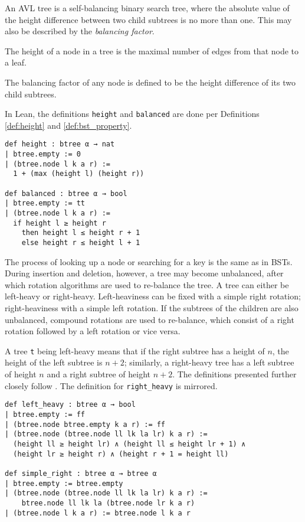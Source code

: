 An AVL tree \cite{avl:original} is a self-balancing binary search tree, where the absolute value of the height difference between two child subtrees is no more than one.
This may also be described by the \textit{balancing factor}.

\begin{definition}
  \label{def:height}
  The height of a node in a tree is the maximal number of edges from that node to a leaf.
\end{definition}

\begin{definition}
  \label{def:balancing_factor}
  The balancing factor of any node is defined to be the height difference of its two child subtrees.
\end{definition}

In Lean, the definitions \lstinline{height} and \lstinline{balanced} are done per Definitions \ref{def:height} and \ref{def:bst_property}.

\begin{lstlisting}
def height : btree α → nat
| btree.empty := 0
| (btree.node l k a r) :=
  1 + (max (height l) (height r))

def balanced : btree α → bool
| btree.empty := tt
| (btree.node l k a r) :=
  if height l ≥ height r 
    then height l ≤ height r + 1
    else height r ≤ height l + 1
\end{lstlisting}

The process of looking up a node or searching for a key is the same as in BSTs. During insertion and deletion, however, a tree may become unbalanced, after which rotation algorithms are used to re-balance the tree. A tree can either be left-heavy or right-heavy. Left-heaviness can be fixed with a simple right rotation; right-heaviness with a simple left rotation. If the subtrees of the children are also unbalanced, compound rotations are used to re-balance, which consist of a right rotation followed by a left rotation or vice versa.

A tree \lstinline{t} being left-heavy means that if the right subtree has a height of $n$, the height of the left subtree is $n+2$; similarly, a right-heavy tree has a left subtree of height $n$ and a right subtree of height $n+2$. The definitions presented further closely follow \cite{textbook:discrete_computer}. The definition for \lstinline{right_heavy} is mirrored.

\begin{lstlisting}
def left_heavy : btree α → bool
| btree.empty := ff
| (btree.node btree.empty k a r) := ff
| (btree.node (btree.node ll lk la lr) k a r) :=
  (height ll ≥ height lr) ∧ (height ll ≤ height lr + 1) ∧
  (height lr ≥ height r) ∧ (height r + 1 = height ll)

def simple_right : btree α → btree α
| btree.empty := btree.empty
| (btree.node (btree.node ll lk la lr) k a r) := 
    btree.node ll lk la (btree.node lr k a r)
| (btree.node l k a r) := btree.node l k a r
\end{lstlisting}

